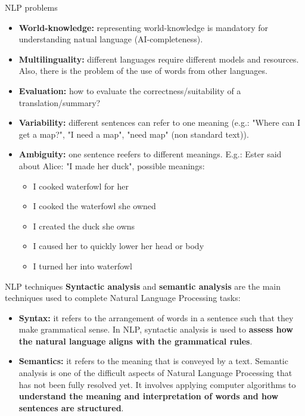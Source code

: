\begin{frame}[containsverbatim]{NLP problems}
    \begin{itemize}
        \item \textbf{World-knowledge:} representing world-knowledge is mandatory for understanding natual language (AI-completeness).
        \item \textbf{Multilinguality:} different languages require different models and resources. Also, there is the problem of the use of words from other languages.
        \item \textbf{Evaluation:} how to evaluate the correctness/suitability of a translation/summary?
        \item \textbf{Variability:} different sentences can refer to one meaning (e.g.: "Where can I get a map?", "I need a map", "need map" (non standard text)).
        \item \textbf{Ambiguity:} one sentence reefers to different meanings. E.g.: Ester said about Alice: "I made her duck", possible meanings:
        \begin{itemize}
            \item I cooked waterfowl for her
            \item I cooked the waterfowl she owned
            \item I created the duck she owns
            \item I caused her to quickly lower her head or body
            \item I turned her into waterfowl
        \end{itemize}
    \end{itemize}
\end{frame}

\begin{frame}[containsverbatim]{NLP techniques}
    \textbf{Syntactic analysis} and \textbf{semantic analysis} are the main techniques used to complete Natural Language Processing tasks:
    \begin{itemize}
        \item\textbf{ Syntax:} it refers to the arrangement of words in a sentence such that they make grammatical sense. In NLP, syntactic analysis is used to \textbf{assess how the natural language aligns with the grammatical rules}.
        \item \textbf{Semantics:} it refers to the meaning that is conveyed by a text. Semantic analysis is one of the difficult aspects of Natural Language Processing that has not been fully resolved yet. It involves applying computer algorithms to \textbf{understand the meaning and interpretation of words and how sentences are structured}.
    \end{itemize}
\end{frame}

